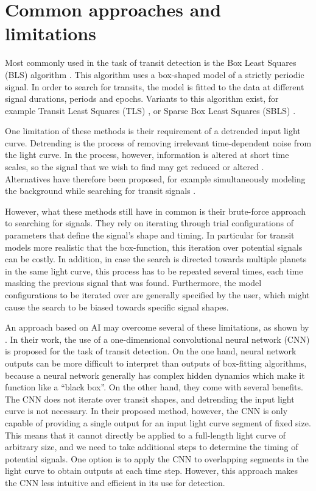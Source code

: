 
\section{Common approaches and limitations}
\label{sec:approaches}

Most commonly used in the task of transit detection is the Box Least Squares (BLS) algorithm \citep{kovacs2002box}. This algorithm uses a box-shaped model of a strictly periodic signal. In order to search for transits, the model is fitted to the data at different signal durations, periods and epochs. Variants to this algorithm exist, for example Transit Least Squares (TLS) \citep{hippke2019optimized}, or Sparse Box Least Squares (SBLS) \citep{panahi2021sparse}.

One limitation of these methods is their requirement of a detrended input light curve. Detrending is the process of removing irrelevant time-dependent noise from the light curve. In the process, however, information is altered at short time scales, so the signal that we wish to find may get reduced or altered \citep{hippke2019wotan}.  Alternatives have therefore been proposed, for example simultaneously modeling the background while searching for transit signals \cite{foreman2015systematic}.

However, what these methods still have in common is their brute-force approach to searching for signals. 
They rely on iterating through trial configurations of parameters that define the signal's shape and timing. In particular for transit models more realistic that the box-function, this iteration over potential signals can be costly. In addition, in case the search is directed towards multiple planets in the same light curve, this process has to be repeated several times, each time masking the previous signal that was found. Furthermore, the model configurations to be iterated over are generally specified by the user, which might cause the search to be biased towards specific signal shapes.

An approach based on AI may overcome several of these limitations, as shown by \cite{pearson2018searching}. In their work, the use of a one-dimensional convolutional neural network (CNN) is proposed for the task of transit detection. On the one hand, neural network outputs can be more difficult to interpret than outputs of box-fitting algorithms, because a neural network generally has complex hidden dynamics which make it function like a ``black box''. On the other hand, they come with several benefits. The CNN does not iterate over transit shapes, and detrending the input light curve is not necessary. 
In their proposed method, however, the CNN is only capable of providing a single output for an input light curve segment of fixed size. 
This means that it cannot directly be applied to a full-length light curve of arbitrary size, and we need to take additional steps to determine the timing of potential signals. One option is to apply the CNN to overlapping segments in the light curve to obtain outputs at each time step. However, this approach makes the CNN less intuitive and efficient in its use for detection. 

